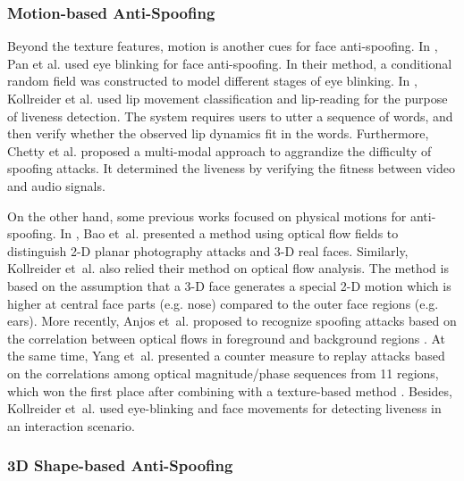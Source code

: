 \documentclass[letterpaper, 10 pt, conference]{ieeeconf}
\begin{document}
\subsubsection{Motion-based Anti-Spoofing}

Beyond the texture features, motion is another cues for face anti-spoofing. In \cite{DBLP:conf/icb/SunPWL07}\cite{DBLP:conf/iccv/PanSWL07}, Pan et al. used eye blinking for face anti-spoofing. In their method, a conditional random field was constructed to model different stages of eye blinking. In \cite{DBLP:journals/tifs/KollreiderFFB07}, Kollreider et al. used lip movement classification and lip-reading for the purpose of liveness detection. The system requires users to utter a sequence of words, and then verify whether the observed lip dynamics fit in the words. Furthermore, Chetty et al. \cite{DBLP:conf/fuzzIEEE/Chetty10}\cite{Chetty05} proposed a multi-modal approach to aggrandize the difficulty of spoofing attacks. It determined the liveness by verifying the fitness between video and audio signals.

On the other hand, some previous works focused on physical motions for anti-spoofing. In \cite{DBLP:conf/IASP/W.Bao}, Bao et~al. presented a method using optical flow fields to distinguish 2-D planar photography attacks and 3-D real faces. Similarly, Kollreider et~al. \cite{DBLP:conf/autoid/KollreiderFB05} \cite{Face_Anti_Spoofing_MotionAnalysis_Kollreider_2007} also relied their method on optical flow analysis. The method is based on the assumption that a 3-D face generates a special 2-D motion which is higher at central face parts (e.g. nose) compared to the outer face regions (e.g. ears). More recently, Anjos et~al. proposed to recognize spoofing attacks based on the correlation between optical flows in foreground and background regions \cite{anjos2013motion}. At the same time, Yang et~al. presented a counter measure to replay attacks based on the correlations among optical magnitude/phase sequences from 11 regions, which won the first place after combining with a texture-based method \cite{Face_Anti_Spoofing_Competition_2013}. Besides, Kollreider et~al. \cite{DBLP:conf/Biometrics/Kollreider} used eye-blinking and face movements for detecting liveness in an interaction scenario.

\subsubsection{3D Shape-based Anti-Spoofing}
\end{document}
